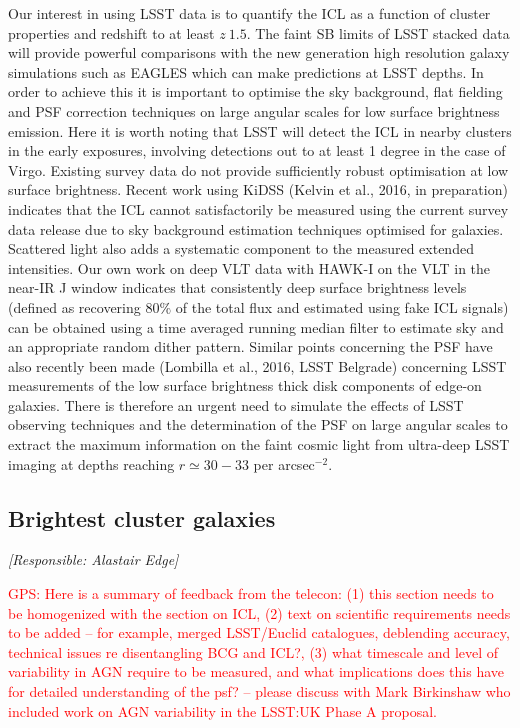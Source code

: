 \documentclass[a4paper,11pt]{article}
\newcommand{\red}{\textcolor{red}}
\begin{document}
Our interest in using LSST data is to quantify the ICL as a function
of cluster properties and redshift to at least $z~1.5$. The faint SB
limits of LSST stacked data will provide powerful comparisons with the
new generation high resolution galaxy simulations such as EAGLES which
can make predictions at LSST depths. In order to achieve this it is
important to optimise the sky background, flat fielding and PSF
correction techniques on large angular scales for low surface
brightness emission. Here it is worth noting that LSST will detect the
ICL in nearby clusters in the early exposures, involving detections
out to at least 1 degree in the case of Virgo. Existing survey data do
not provide sufficiently robust optimisation at low surface
brightness. Recent work using KiDSS (Kelvin et al., 2016, in
preparation) indicates that the ICL cannot satisfactorily be measured
using the current survey data release due to sky background estimation
techniques optimised for galaxies. Scattered light also adds a
systematic component to the measured extended intensities. Our own
work on deep VLT data with HAWK-I on the VLT in the near-IR J window
indicates that consistently deep surface brightness levels (defined as
recovering $80\%$ of the total flux and estimated using fake ICL
signals) can be obtained using a time averaged running median filter
to estimate sky and an appropriate random dither pattern. Similar
points concerning the PSF have also recently been made (Lombilla et
al., 2016, LSST Belgrade) concerning LSST measurements of the low
surface brightness thick disk components of edge-on galaxies. There is
therefore an urgent need to simulate the effects of LSST observing
techniques and the determination of the PSF on large angular scales to
extract the maximum information on the faint cosmic light from
ultra-deep LSST imaging at depths reaching $r \simeq 30-33$ per
arcsec$^{-2}$.

\subsection{Brightest cluster galaxies}

{\it [Responsible: Alastair Edge]}

\noindent\red{GPS: Here is a summary of feedback from the telecon: (1)
  this section needs to be homogenized with the section on ICL, (2)
  text on scientific requirements needs to be added -- for example,
  merged LSST/Euclid catalogues, deblending accuracy, technical issues
  re disentangling BCG and ICL?, (3) what timescale and level of
  variability in AGN require to be measured, and what implications
  does this have for detailed understanding of the psf? -- please
  discuss with Mark Birkinshaw who included work on AGN variability in
  the LSST:UK Phase A proposal.}
\end{document}

